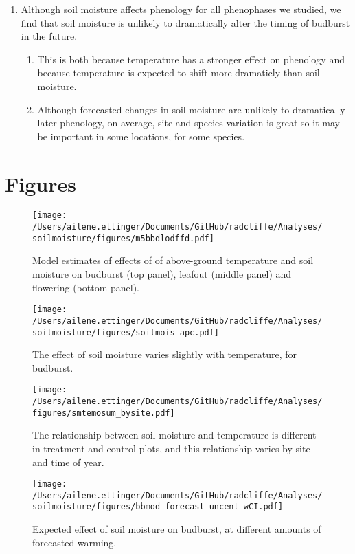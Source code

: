 \documentclass{article}
\begin{document}
\begin{enumerate}
\item Although soil moisture affects phenology for all phenophases we studied, we find that soil moisture is unlikely to dramatically alter the timing of budburst in the future. 
\begin {enumerate}
\item This is both because temperature has a stronger effect on phenology and because temperature is expected to shift more dramaticly than soil moisture.
\item Although forecasted changes in soil moisture are unlikely to dramatically later phenology, on average, site and species variation is great so it may be important in some locations, for some species. 

\end{enumerate}
\end{enumerate}


\section* {Figures}

 \begin{figure}[h]
\centering
 \texttt{[image: /Users/ailene.ettinger/Documents/GitHub/radcliffe/Analyses/soilmoisture/figures/m5bbdlodffd.pdf]}
 \caption{Model estimates of effects of of above-ground temperature and soil moisture on budburst (top panel), leafout (middle panel) and flowering (bottom panel).} 
 \label{fig:modests}
 \end{figure}
\begin{figure}[h]
\centering
 \texttt{[image: /Users/ailene.ettinger/Documents/GitHub/radcliffe/Analyses/soilmoisture/figures/soilmois\_apc.pdf]}
 \caption{The effect of soil moisture varies slightly with temperature, for budburst.} 
 \label{fig:smtempbb}
 \end{figure}

\begin{figure}[h]
\centering
 \texttt{[image: /Users/ailene.ettinger/Documents/GitHub/radcliffe/Analyses/figures/smtemosum\_bysite.pdf]}
 \caption{The relationship between soil moisture and temperature is different in treatment and control plots, and this relationship varies by site and time of year.} 
 \label{fig:site}
 \end{figure}

\begin{figure}[h]
\centering
 \texttt{[image: /Users/ailene.ettinger/Documents/GitHub/radcliffe/Analyses/soilmoisture/figures/bbmod\_forecast\_uncent\_wCI.pdf]}
 \caption{Expected effect of soil moisture on budburst, at different amounts of forecasted warming.} 
 \label{fig:forecast}
 \end{figure}
 
\end{document}
